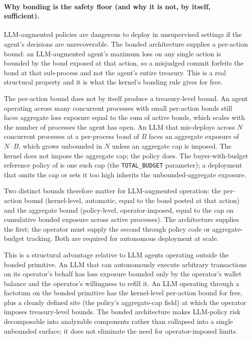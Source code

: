 \documentclass[11pt,a4paper]{article}
\theoremstyle{definition}
\theoremstyle{remark}
\begin{document}
\paragraph{Why bonding is the safety floor (and why it is not, by itself, sufficient).}
LLM-augmented policies are dangerous to deploy in unsupervised
settings if the agent's decisions are unrecoverable. The bonded
architecture supplies a per-action bound: an LLM-augmented agent's
maximum loss on any single action is bounded by the bond exposed
at that action, so a misjudged commit forfeits the bond at that
sub-process and not the agent's entire treasury. This is a real
structural property and it is what the kernel's bonding rule
gives for free.

The per-action bound does not by itself produce a treasury-level
bound. An agent operating across many concurrent processes with
small per-action bonds still faces aggregate loss exposure equal
to the sum of active bonds, which scales with the number of
processes the agent has open. An LLM that mis-deploys across
$N$ concurrent processes at a per-process bond of $B$ faces an
aggregate exposure of $N \cdot B$, which grows unbounded in $N$
unless an aggregate cap is imposed. The kernel does not impose
the aggregate cap; the policy does. The buyer-with-budget
reference policy of  is one such cap (the
\texttt{TOTAL\_BUDGET} parameter); a deployment that omits the
cap or sets it too high inherits the unbounded-aggregate exposure.

Two distinct bounds therefore matter for LLM-augmented operation:
the per-action bound (kernel-level, automatic, equal to the bond
posted at that action) and the aggregate bound (policy-level,
operator-imposed, equal to the cap on cumulative bonded exposure
across active processes). The architecture supplies the first;
the operator must supply the second through policy code or
aggregate-budget tracking. Both are required for autonomous
deployment at scale.

This is a structural advantage relative to LLM agents operating
outside the bonded primitive. An LLM that can autonomously execute
arbitrary transactions on its operator's behalf has loss exposure
bounded only by the operator's wallet balance and the operator's
willingness to refill it. An LLM operating through a factotum on
the bonded primitive has the kernel-level per-action bound for
free, plus a cleanly defined site (the policy's aggregate-cap
field) at which the operator imposes treasury-level bounds. The
bonded architecture makes LLM-policy risk decomposable into
analyzable components rather than collapsed into a single
unbounded surface; it does not eliminate the need for
operator-imposed limits.
\end{document}
